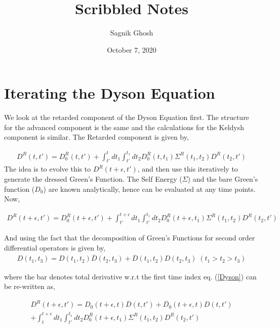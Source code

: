 \documentclass{amsart}
\title{Scribbled Notes}
\author{Sagnik Ghosh}
\date{October 7, 2020}
\begin{document}
\maketitle

\section{Iterating the Dyson Equation}

    We look at the retarded component of the Dyson Equation first. The structure for the advanced component is the same and the calculations for the Keldysh component is similar. The Retarded component is given by,

    \begin{align}
        D^R(t , t') = D_0^R(t, t') + \int^t_{t'} dt_1\int^{t_1}_{t'} dt_2 D_0^R(t, t_1) \Sigma^R (t_1,t_2) D^R(t_2, t')
    \end{align}
     The idea is to evolve this to $D^R(t+\epsilon , t')$, and then use this iteratively to generate the dressed Green's Function. The Self Energy ($\Sigma$) and the bare Green's function ($D_0$) are known analytically, hence can be evaluated at any time points. Now,  
     
    \begin{align}\label{Dyson}
        D^R(t+\epsilon , t') = D_0^R(t+\epsilon, t') + \int^{t+\epsilon}_{t'} dt_1\int^{t_1}_{t'} dt_2 D_0^R(t+\epsilon, t_1) \Sigma^R (t_1,t_2) D^R(t_2, t')
    \end{align}
    
    And using the fact that the decomposition of Green's Functions for second order differential operators is given by,
    \begin{align}
        D(t_1 , t_3)=D(t_1 , t_2)\overline{D}(t_2 , t_3)+\overline{D}(t_1 , t_2)D(t_2 , t_3) \; (t_1>t_2>t_3)
    \end{align}
    
    where the bar denotes total derivative w.r.t the first time index eq. (\ref{Dyson}) can be re-written as,
    
    \par 
    \begin{multline}\label{DysonReduced}
        D^R(t+\epsilon , t') = D_0(t+\epsilon , t)\overline{D}(t , t')+\overline{D_0}(t+\epsilon , t)D(t , t')
        \\ + \int^{t+\epsilon}_{t} dt_1\int^{t_1}_{t'} dt_2 D_0^R(t+\epsilon, t_1) \Sigma^R (t_1,t_2) D^R(t_2, t')
    \end{multline}
        
\end{document}
